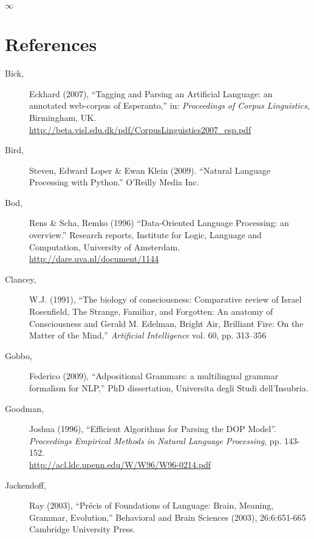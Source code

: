 \documentclass[10pt,a4paper]{article}
\begin{document}
\begin{center}
$\infty$
\end{center}


\section{References}

\begin{description}
\item[Bick,] Eckhard (2007), ``Tagging and Parsing an Artificial Language: an
annotated web-corpus of Esperanto,'' in: {\em Proceedings of Corpus
Linguistics}, Birmingham, UK. \\
\url{http://beta.visl.sdu.dk/pdf/CorpusLinguistics2007_esp.pdf}

\item[Bird,] Steven, Edward Loper \& Ewan Klein (2009).
    ``Natural Language Processing with Python.''  O'Reilly Media Inc.

\item[Bod,] Rens \& Scha, Remko (1996) ``Data-Oriented Language Processing: an
overview.'' Research reports, Institute for Logic, Language and Computation,
University of Amsterdam. \\
\url{http://dare.uva.nl/document/1144}

\item[Clancey,] W.J. (1991), ``The biology of consciousness: Comparative review
of Israel Rosenfield, The Strange, Familiar, and Forgotten: An anatomy of
Consciousness and Gerald M. Edelman, Bright Air, Brilliant Fire: On the Matter
of the Mind,'' {\em Artificial Intelligence} vol. 60, pp. 313--356

\item[Gobbo,] Federico (2009), ``Adpositional Grammars: a multilingual grammar
formalism for NLP,'' PhD dissertation, Universita degli Studi dell'Insubria.

\item[Goodman,] Joshua (1996), ``Efficient Algorithms for Parsing the DOP
Model''. {\em Proceedings Empirical Methods in Natural Language Processing},
pp. 143-152. \\ \url{http://acl.ldc.upenn.edu/W/W96/W96-0214.pdf}

\item[Jackendoff,] Ray (2003), ``Précis of Foundations of Language: Brain, Meaning,
Grammar, Evolution,'' Behavioral and Brain Sciences (2003), 26:6:651-665
Cambridge University Press.


\end{description}
\end{document}
